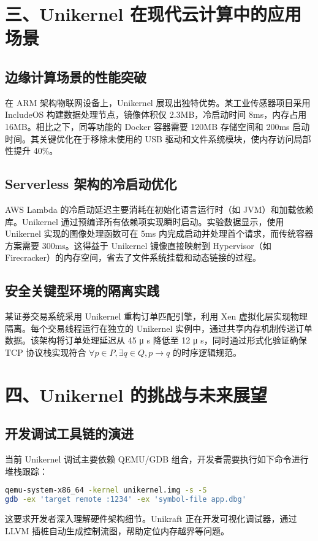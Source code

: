 \chapter{三、Unikernel 在现代云计算中的应用场景}
\section{边缘计算场景的性能突破}
在 ARM 架构物联网设备上，Unikernel 展现出独特优势。某工业传感器项目采用 IncludeOS 构建数据处理节点，镜像体积仅 2.3MB，冷启动时间 8ms，内存占用 16MB。相比之下，同等功能的 Docker 容器需要 120MB 存储空间和 200ms 启动时间。其关键优化在于移除未使用的 USB 驱动和文件系统模块，使内存访问局部性提升 40\%{}。\par
\section{Serverless 架构的冷启动优化}
AWS Lambda 的冷启动延迟主要消耗在初始化语言运行时（如 JVM）和加载依赖库。Unikernel 通过预编译所有依赖项实现瞬时启动。实验数据显示，使用 Unikernel 实现的图像处理函数可在 5ms 内完成启动并处理首个请求，而传统容器方案需要 300ms。这得益于 Unikernel 镜像直接映射到 Hypervisor（如 Firecracker）的内存空间，省去了文件系统挂载和动态链接的过程。\par
\section{安全关键型环境的隔离实践}
某证券交易系统采用 Unikernel 重构订单匹配引擎，利用 Xen 虚拟化层实现物理隔离。每个交易线程运行在独立的 Unikernel 实例中，通过共享内存机制传递订单数据。该架构将订单处理延迟从 45 μ s 降低至 12 μ s，同时通过形式化验证确保 TCP 协议栈实现符合 $\forall p \in P, \exists q \in Q, p \rightarrow q$ 的时序逻辑规范。\par
\chapter{四、Unikernel 的挑战与未来展望}
\section{开发调试工具链的演进}
当前 Unikernel 调试主要依赖 QEMU/GDB 组合，开发者需要执行如下命令进行堆栈跟踪：\par
\begin{lstlisting}[language=bash]
qemu-system-x86_64 -kernel unikernel.img -s -S
gdb -ex 'target remote :1234' -ex 'symbol-file app.dbg'
\end{lstlisting}
这要求开发者深入理解硬件架构细节。Unikraft 正在开发可视化调试器，通过 LLVM 插桩自动生成控制流图，帮助定位内存越界等问题。\par
